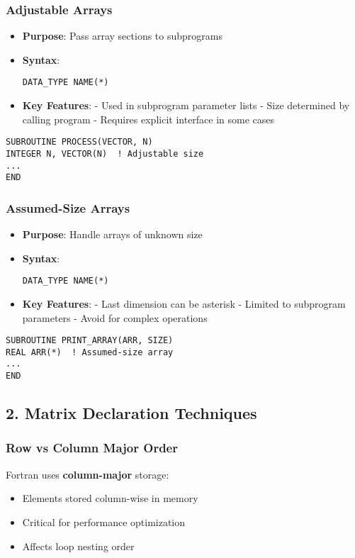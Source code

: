 \documentclass{book}
\begin{document}
\subsubsection*{Adjustable Arrays}
\begin{itemize}
\item \textbf{Purpose}: Pass array sections to subprograms
\item \textbf{Syntax}: 
\begin{verbatim}
DATA_TYPE NAME(*)
\end{verbatim}
\item \textbf{Key Features}:
  - Used in subprogram parameter lists
  - Size determined by calling program
  - Requires explicit interface in some cases
\end{itemize}

\begin{verbatim}
SUBROUTINE PROCESS(VECTOR, N)
INTEGER N, VECTOR(N)  ! Adjustable size
...
END
\end{verbatim}

\subsubsection*{Assumed-Size Arrays}
\begin{itemize}
\item \textbf{Purpose}: Handle arrays of unknown size
\item \textbf{Syntax}: 
\begin{verbatim}
DATA_TYPE NAME(*)
\end{verbatim}
\item \textbf{Key Features}:
  - Last dimension can be asterisk
  - Limited to subprogram parameters
  - Avoid for complex operations
\end{itemize}

\begin{verbatim}
SUBROUTINE PRINT_ARRAY(ARR, SIZE)
REAL ARR(*)  ! Assumed-size array
...
END
\end{verbatim}

\subsection*{2. Matrix Declaration Techniques}
\subsubsection*{Row vs Column Major Order}
Fortran uses \textbf{column-major} storage:
\begin{itemize}
\item Elements stored column-wise in memory
\item Critical for performance optimization
\item Affects loop nesting order
\end{itemize}
\end{document}
